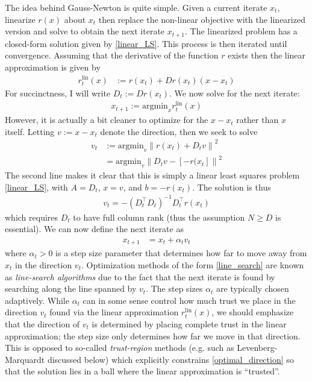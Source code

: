 \documentclass[12pt]{article}
\newcommand*{\norm}[1]{\left\lVert#1\right\rVert}
\begin{document}
The idea behind Gauss-Newton is quite simple. Given a current iterate $x_t$, linearize $r(x)$ about $x_t$ then replace the non-linear objective with the linearized version and solve to obtain the 
next iterate $x_{t+1}$. The linearized problem has a closed-form solution given by \ref{linear_LS}. This process is then iterated until convergence. Assuming that the derivative of the function $r$ 
exists then the linear approximation is given by 
\begin{align}
r_t^{\text{lin}}(x) &:= r(x_t) + Dr(x_t)\left(x - x_t \right) 
\end{align}
For succinctness, I will write $D_t := Dr(x_t)$. We now solve for the next iterate:
\begin{align*}
x_{t + 1} := \text{argmin}_x r_t^{\text{lin}}(x)
\end{align*}
However, it is actually a bit cleaner to optimize for the  $x - x_t$ rather than $x$ itself. Letting $v := x - x_t$ denote the direction, then we seek to solve
\begin{align}
v_t &:= \text{argmin}_v \norm{r(x_t) + D_t v}^2 \label{optimal_direction} \\
	      &= \text{argmin}_v \norm{D_t v - [-r(x_t]}^2
\end{align}
The second line makes it clear that this is simply a linear least squares problem \ref{linear_LS}, with $A = D_t$, $x = v$, and $b = -r(x_t)$. The solution is thus 
\begin{align*}
v_t = -\left(D_t^\top D_t \right)^{-1} D_t^\top r(x_t)
\end{align*}
which requires $D_t$ to have full column rank (thus the assumption $N \geq D$ is essential). We can now define the next iterate as 
\begin{align}
x_{t + 1} &= x_t + \alpha_t v_t \label{line_search}
\end{align}
where $\alpha_t > 0$ is a step size parameter that determines how far to move away from $x_t$ in the direction $v_t$. Optimization methods of the form \ref{line_search} are known as 
\textit{line-search algorithms} due to the fact that the next iterate is found by searching along the line spanned by $v_t$. The step sizes $\alpha_t$ are typically chosen adaptively. While 
$\alpha_t$ can in some sense control how much trust we place in the direction $v_t$ found via the linear approximation $r_t^{\text{lin}}(x)$, we should emphasize that the direction of $v_t$ is 
determined by placing complete trust in the linear approximation; the step size only determines how far we move in that direction. This is opposed to so-called \textit{trust-region} methods
(e.g. such as Levenberg-Marquardt discussed below) which explicitly constrains \ref{optimal_direction} so that the solution lies in a ball where the linear approximation is ``trusted''. 
\end{document}
